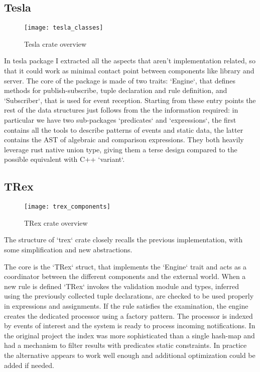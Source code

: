 \subsection{Tesla}

\begin{figure}[h]
  \centering
  \texttt{[image: tesla\_classes]}
  \caption{Tesla crate overview}
\end{figure}

In tesla package I extracted all the aspects that aren't implementation related, so that it could work as minimal contact point between components like library and server. The core of the package is made of two traits: `Engine`, that defines methods for publish-subscribe, tuple declaration and rule definition, and `Subscriber`, that is used for event reception. Starting from these entry points the rest of the data structures just follows from the the information required: in particular we have two sub-packages `predicates` and `expressions`, the first contains all the tools to describe patterns of events and static data, the latter contains the AST of algebraic and comparison expressions. They both heavily leverage rust native union type, giving them a terse design compared to the possible equivalent with C++ `variant`.

\subsection{TRex}

\begin{figure}[h]
  \centering
  \texttt{[image: trex\_components]}
  \caption{TRex crate overview}
\end{figure}

The structure of `trex` crate closely recalls the previous implementation, with some simplification and new abstractions.

The core is the `TRex` struct, that implements the `Engine` trait and acts as a coordinator between the different components and the external world. When a new rule is defined `TRex` invokes the validation module and types, inferred using the previously collected tuple declarations, are checked to be used properly in expressions and assignments. If the rule satisfies the examination, the engine creates the dedicated processor using a factory pattern. The processor is indexed by events of interest and the system is ready to process incoming notifications. In the original project the index was more sophisticated than a single hash-map and had a mechanism to filter results with predicates static constraints. In practice the alternative appears to work well enough and additional optimization could be added if needed.

